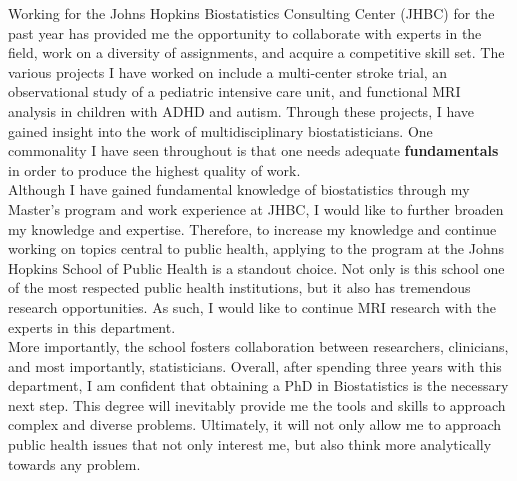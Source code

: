 \documentclass[12pt]{article}
\begin{document}
Working for the Johns Hopkins Biostatistics Consulting Center (JHBC) for the past year has provided me the opportunity to collaborate with experts in the field, work on a diversity of assignments, and acquire a competitive skill set. The various projects I have worked on include a multi-center stroke trial, an observational study of a pediatric intensive care unit, and functional MRI analysis in children with ADHD and autism. Through these projects, I have gained insight into the work of multidisciplinary biostatisticians. One commonality I have seen throughout is that one needs adequate \textbf{fundamentals} in order to produce the highest quality of work. \\

Although I have gained fundamental knowledge of biostatistics through my Master's program and work experience at JHBC, I would like to further broaden my knowledge and expertise. Therefore, to increase my knowledge and continue working on topics central to public health, applying to the program at the Johns Hopkins School of Public Health is a standout choice. Not only is this school one of the most respected public health institutions, but  it also has tremendous research opportunities.  As such, I would like to continue MRI research with the experts in this department.  \\

More importantly, the school fosters collaboration between researchers, clinicians, and most importantly, statisticians.  Overall, after spending three years with this department, I am confident that obtaining a PhD in Biostatistics is the necessary next step. This degree will inevitably provide me the tools and skills to approach complex and diverse problems. Ultimately, it will not only allow me to approach public health issues that not only interest me, but also think more analytically towards any problem.
\end{document}
